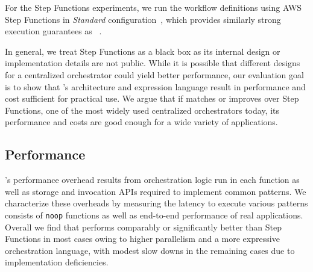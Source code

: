 For the Step Functions experiments, we run the workflow definitions using AWS
Step Functions in \emph{Standard}
configuration~\cite{aws-step-functions-standard-vs-express}, which provides
similarly strong execution guarantees as
\name{}~\cite{aws-step-functions-exec-gntee}.

In general, we treat Step Functions as a black box as its internal design or
implementation details are not public. While it is possible that different
designs for a centralized orchestrator could yield better performance, our
evaluation goal is to show that \name{}'s architecture and expression language
result in performance and cost sufficient for practical use. We argue that if
\name{} matches or improves over Step Functions, one of the most widely used
centralized orchestrators today, its performance and costs are good enough for
a wide variety of applications.



\subsection{Performance}\label{sec:eval:micro}

\name{}'s performance overhead results from orchestration logic run in each
function as well as storage and invocation APIs required to implement common
patterns. We characterize these overheads by measuring the latency to execute
various patterns consists of \texttt{noop} functions as well as end-to-end
performance of real applications. Overall we find that \name{} performs
comparably or significantly better than Step Functions in most cases owing to
higher parallelism and a more expressive orchestration language, with modest
slow downs in the remaining cases due to implementation deficiencies.

